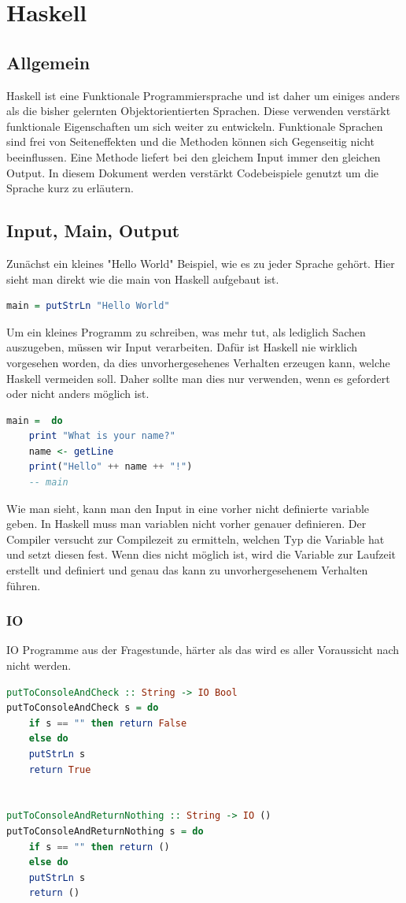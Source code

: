 \chapter{Haskell}
\label{sec:Haskell}
\section{Allgemein}
Haskell ist eine Funktionale Programmiersprache und ist daher um einiges anders als die bisher gelernten Objektorientierten Sprachen. Diese verwenden verstärkt funktionale Eigenschaften um sich weiter zu entwickeln. Funktionale Sprachen sind frei von Seiteneffekten und die Methoden können sich Gegenseitig nicht beeinflussen. Eine Methode liefert bei den gleichem Input immer den gleichen Output.
In diesem Dokument werden verstärkt Codebeispiele genutzt um die Sprache kurz zu erläutern. 
\section{Input, Main, Output}
Zunächst ein kleines "Hello World" Beispiel, wie es zu jeder Sprache gehört. Hier sieht man direkt wie die main von Haskell aufgebaut ist.
\newline
\begin{lstlisting}[language=Haskell]  
main = putStrLn "Hello World"
\end{lstlisting}
\qquad\newline
Um ein kleines Programm zu schreiben, was mehr tut, als lediglich Sachen auszugeben, müssen wir Input verarbeiten. Dafür ist Haskell nie wirklich vorgesehen worden, da dies unvorhergesehenes Verhalten erzeugen kann, welche Haskell vermeiden soll. Daher sollte man dies nur verwenden, wenn es gefordert oder nicht anders möglich ist. 
\newline
\begin{lstlisting}[language=Haskell]  
main = 	do
	print "What is your name?"
	name <- getLine
	print("Hello" ++ name ++ "!")
	-- main 
\end{lstlisting}
\qquad\newline
Wie man sieht, kann man den Input in eine vorher nicht definierte variable geben. In Haskell muss man variablen nicht vorher genauer definieren. Der Compiler versucht zur Compilezeit zu ermitteln, welchen Typ die Variable hat und setzt diesen fest. Wenn dies nicht möglich ist, wird die Variable zur Laufzeit erstellt und definiert und genau das kann zu unvorhergesehenem Verhalten führen. 
\subsection{IO}
IO Programme aus der Fragestunde, härter als das wird es aller Voraussicht nach nicht werden. 
\begin{lstlisting}[language=Haskell]  
putToConsoleAndCheck :: String -> IO Bool
putToConsoleAndCheck s = do
	if s == "" then return False 
	else do
	putStrLn s
	return True


putToConsoleAndReturnNothing :: String -> IO ()
putToConsoleAndReturnNothing s = do
	if s == "" then return () 
	else do
	putStrLn s
	return ()
\end{lstlisting}
